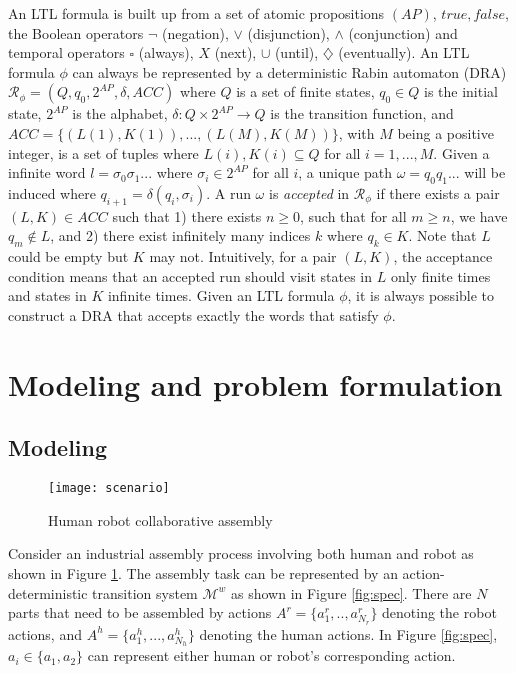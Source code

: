 \documentclass[journal]{IEEEtran}
\begin{document}
An LTL formula is built up from a set of atomic propositions $(AP)$, $true,false$, the Boolean operators $\neg$ (negation), $\vee$ (disjunction), $\wedge$ (conjunction) and temporal operators  $\square$ (always), $X$ (next), $\cup$ (until), $\diamondsuit$ (eventually). An LTL formula $\phi$ can always be represented by a deterministic Rabin automaton (DRA) \cite{baier2008principles} $\mathcal{R}_{\phi}=(Q,q_0, 2^{AP},\delta, ACC)$ where $Q$ is a set of finite states, $q_0\in Q$ is the initial state,  $2^{AP}$ is the alphabet, $\delta:Q\times 2^{AP}\rightarrow Q$ is the transition function, and $ACC=\{(L(1),K(1)),...,(L(M),K(M))\}$, with $M$ being a positive integer, is a set of tuples where $L(i),K(i)\subseteq Q$ for all $i=1,...,M$. Given a infinite word $l=\sigma_0\sigma_1...$ where $\sigma_i\in 2^{AP}$ for all $i$, a unique path $\omega=q_0q_1...$ will be induced where $q_{i+1}=\delta(q_i,\sigma_i)$. A run $\omega$ is \emph{{accepted}} in $\mathcal{R}_\phi$ if there exists a pair $(L,K)\in ACC$ such that 1) there exists $n\geq 0$, such that for all $m\geq n$, we have $q_m\notin L$, and 2) there exist infinitely many indices $k$ where $q_k\in K$. Note that $L$ could be empty but $K$ may not. Intuitively, for a pair $(L,K)$, the acceptance condition means that an accepted run should visit states in $L$ only finite times and states in $K$ infinite times. Given an LTL formula $\phi$, it is always possible to construct a DRA that accepts exactly the words that satisfy $\phi$.

\section{Modeling and problem formulation}
\label{sec: problem-formulation}
\subsection{Modeling}
\begin{figure}[h]
	\centering
	\texttt{[image: scenario]}
	\caption{Human robot collaborative assembly}
	\label{fig:scenario}	
\end{figure}
Consider an industrial assembly process involving both human and robot as shown in Figure \ref{fig:scenario}. The assembly task can be represented by an action-deterministic transition system $\mathcal{M}^w$ as shown in Figure \ref{fig:spec}. There are $N$ parts that need to be assembled by actions $A^r=\{a^r_1,..,a^r_{N_r}\}$ denoting the robot actions, and $A^h=\{a^h_1,...,a^h_{N_h}\}$ denoting the human actions. In Figure \ref{fig:spec}, $a_i\in\{a_1,a_2\}$ can represent  either human or robot's corresponding action. %
\end{document}
